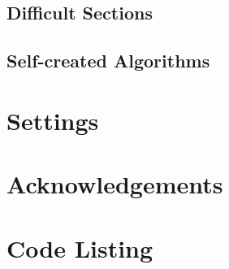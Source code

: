 \subsection{Difficult Sections}

\subsection{Self-created Algorithms}

\section{Settings}

\section{Acknowledgements}

\section{Code Listing}


